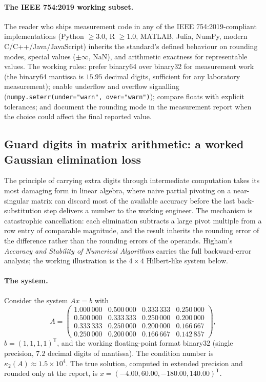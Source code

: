 \paragraph{The IEEE 754:2019 working subset.} The reader who
ships measurement code in any of the IEEE 754:2019-compliant
implementations (Python $\geq 3.0$, R $\geq 1.0$, MATLAB,
Julia, NumPy, modern C/C++/Java/JavaScript) inherits the
standard's defined behaviour on rounding modes, special
values ($\pm\infty$, NaN), and arithmetic exactness for
representable values. The working rules: prefer binary64
over binary32 for measurement work (the binary64 mantissa is
$15.95$ decimal digits, sufficient for any laboratory
measurement); enable underflow and overflow signalling
(\texttt{numpy.seterr(under="warn", over="warn")}); compare
floats with explicit tolerances; and document the rounding
mode in the measurement report when the choice could affect
the final reported value.

\subsection{Guard digits in matrix arithmetic: a worked Gaussian
elimination loss}

The principle of carrying extra digits through intermediate
computation takes its most damaging form in linear algebra,
where naive partial pivoting on a near-singular matrix can
discard most of the available accuracy before the last
back-substitution step delivers a number to the working
engineer. The mechanism is catastrophic cancellation: each
elimination subtracts a large pivot multiple from a row entry
of comparable magnitude, and the result inherits the rounding
error of the difference rather than the rounding errors of the
operands. Higham's \emph{Accuracy and Stability of Numerical
Algorithms} \cite{text:ch04t3b-higham-asna-2002} carries the
full backward-error analysis; the working illustration is the
$4 \times 4$ Hilbert-like system below.

\paragraph{The system.} Consider the system $A x = b$ with
\[
A = \begin{pmatrix}
1.000\,000 & 0.500\,000 & 0.333\,333 & 0.250\,000 \\
0.500\,000 & 0.333\,333 & 0.250\,000 & 0.200\,000 \\
0.333\,333 & 0.250\,000 & 0.200\,000 & 0.166\,667 \\
0.250\,000 & 0.200\,000 & 0.166\,667 & 0.142\,857
\end{pmatrix},
\]
$b = (1, 1, 1, 1)^{\mathsf{T}}$, and the working
floating-point format binary32 (single precision, $7.2$ decimal
digits of mantissa). The condition number is
$\kappa_{2}(A) \approx 1.5 \times 10^{4}$. The true solution,
computed in extended precision and rounded only at the report,
is $x = (-4.00, 60.00, -180.00, 140.00)^{\mathsf{T}}$.

